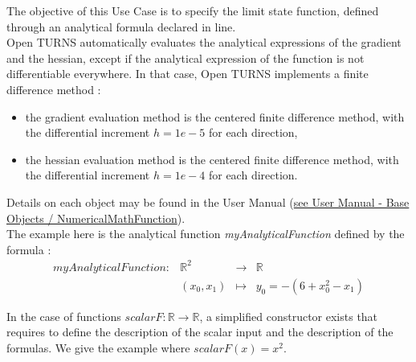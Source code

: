 \renewcommand{\filename}{docUC_LSF_Analytical.tex}
\renewcommand{\filetitle}{UC : From an analytical formula declared inline}

\HeaderIIILevel




The objective of this Use Case is to specify the limit state function, defined through an analytical formula declared in line.\\

Open TURNS automatically evaluates the analytical expressions of the gradient and the hessian, except if the analytical expression of the function is not differentiable everywhere. In that case, Open TURNS implements a finite difference method :
\begin{itemize}
\item the gradient evaluation method is the centered finite difference method, with the differential increment $h=1e-5$ for each direction,
\item the hessian evaluation method is the centered finite difference method, with the differential increment $h=1e-4$ for each direction.
\end{itemize}

Details on each object may be found in the User Manual  (\href{OpenTURNS_UserManual_TUI.pdf}{see User Manual - Base Objects / NumericalMathFunction}).\\



The example here is the analytical function {\itshape myAnalyticalFunction} defined by the formula :
$$
\begin{array}{l|cll}
  myAnalyticalFunction : &   \mathbb{R}^2 & \rightarrow & \mathbb{R} \\
  & (x_0, x_1)     & \mapsto     & y_0 = -(6+x_0^2-x_1)
\end{array}
$$

In the case of functions $scalarF : \mathbb{R}  \rightarrow \mathbb{R}$, a simplified constructor exists that requires to define the description of the scalar input and the description of the formulas. We give the example where $scalarF(x) = x^2$.\\

